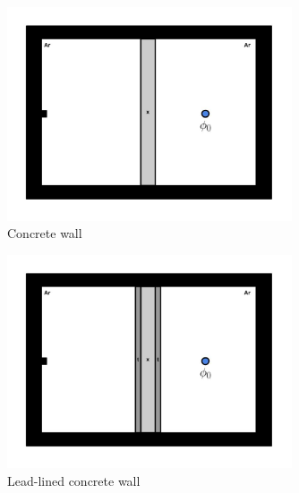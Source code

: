 \documentclass[11pt,a4paper]{article}
\begin{document}
\begin{figure}[h!]
    \centering
    \includegraphics[width=0.75\textwidth]{hw2-15a.jpg}
    \caption{Concrete wall}
    \label{fig-concrete-wall}
\end{figure}

\begin{figure}[h!]
    \centering
    \includegraphics[width=0.75\textwidth]{hw2-15b.jpg}
    \caption{Lead-lined concrete wall}
    \label{fig-concrete-lead-wall}
\end{figure}

\newpage 


\setlength{\bibhang}{0pt}

\end{document}
